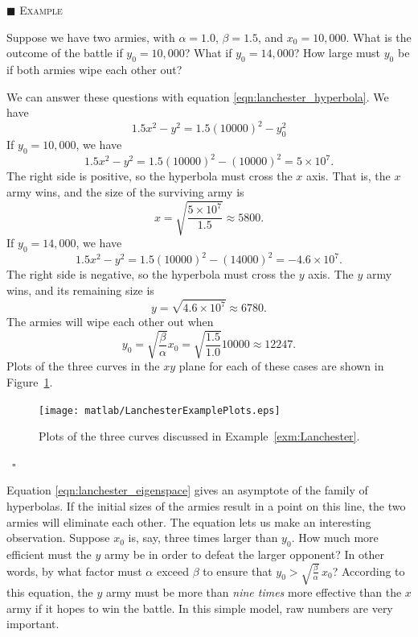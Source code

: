 \documentclass[reqno]{immbook}
\numberwithin{equation}{chapter}
\numberwithin{question}{section}
\numberwithin{theorem}{chapter}
\numberwithin{figure}{chapter}
\theoremstyle{definition}
\newenvironment{xexample}%
{%

\medskip\noindent\addtocounter{example}{1}$\blacksquare$ \textsc{Example \theexample}\hspace*{1em}%
}%
{%
~\hfill$\square$

\medskip
}
\begin{document}
\begin{xexample}
\label{exm:Lanchester}
Suppose we have two armies, with $\alpha=1.0$,
$\beta = 1.5$, and $x_0=10,000$.
What is the outcome of the battle if
$y_0=10,000$?  What if $y_0=14,000$?
How large must $y_0$ be if both armies
wipe each other out?

We can answer these questions with
equation \eqref{eqn:lanchester_hyperbola}.
We have
\begin{equation}
  1.5x^2-y^2 = 1.5(10000)^2-y_0^2
\end{equation}
If $y_0=10,000$, we have
\begin{equation}
  1.5x^2-y^2 = 1.5(10000)^2-(10000)^2 = 5\times 10^7.
\end{equation}
The right side is positive, so the hyperbola must cross
the $x$ axis.  That is, the $x$ army wins, and the
size of the surviving army is
\begin{equation}
   x = \sqrt{\frac{5\times 10^7}{1.5}} \approx 5800.
\end{equation}
If $y_0=14,000$, we have
\begin{equation}
  1.5x^2-y^2 = 1.5(10000)^2-(14000)^2 = -4.6\times 10^7.
\end{equation}
The right side is negative, so the hyperbola must
cross the $y$ axis.  The $y$ army wins, and its remaining size
is
\begin{equation}
   y = \sqrt{4.6\times 10^7} \approx 6780.
\end{equation}
The armies will wipe each other out when
\begin{equation}
  y_0 = \sqrt{\frac{\beta}{\alpha}}x_0 
      = \sqrt{\frac{1.5}{1.0}}10000
      \approx 12247.
\end{equation}
Plots of the three curves in the $xy$ plane for each of these
cases are shown in Figure~\ref{fig:LanchesterExamplePlots}.
\begin{figure}
\centerline{\texttt{[image: matlab/LanchesterExamplePlots.eps]}}
\caption{Plots of the three curves discussed in
Example~\ref{exm:Lanchester}.}
\label{fig:LanchesterExamplePlots}
\end{figure}
\end{xexample}

Equation \eqref{eqn:lanchester_eigenspace} gives an asymptote
of the family of hyperbolas.
If the initial sizes of the armies result in a point
on this line, the two armies will eliminate each other.
The equation lets us make an interesting observation.
Suppose $x_0$ is, say, three times larger than $y_0$.
How much more efficient must the $y$ army be in order to
defeat the larger opponent?
In other words, by what factor must $\alpha$
exceed $\beta$
to ensure that $y_0 > \sqrt{\frac{\beta}{\alpha}}\,x_0$?
According to
this equation, the $y$ army must
be more than \emph{nine times} more effective than the $x$ army
if it hopes to win the battle.
In this simple model, raw numbers are very important.
\end{document}
